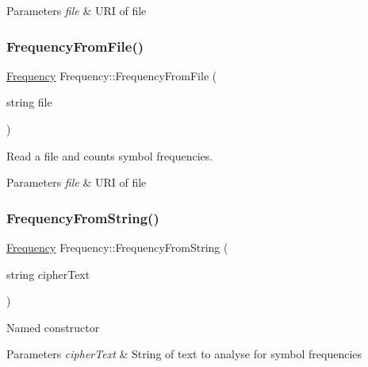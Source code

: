 \begin{DoxyParams}{Parameters}
{\em file} & U\+RI of file \\
\hline
\end{DoxyParams}
\mbox{\label{classFrequency_ae46fea585785720e124b45643914f4c6}} 
\subsubsection{\texorpdfstring{Frequency\+From\+File()}{FrequencyFromFile()}}
{\footnotesize\ttfamily \hyperlink{classFrequency}{Frequency} Frequency\+::\+Frequency\+From\+File (\begin{DoxyParamCaption}\item[{string}]{file }\end{DoxyParamCaption})\hspace{0.3cm}{\ttfamily [static]}}

Read a file and counts symbol frequencies.


\begin{DoxyParams}{Parameters}
{\em file} & U\+RI of file \\
\hline
\end{DoxyParams}
\mbox{\label{classFrequency_a1f7df4dabf9cdf839f9884ee844c6752}} 
\subsubsection{\texorpdfstring{Frequency\+From\+String()}{FrequencyFromString()}}
{\footnotesize\ttfamily \hyperlink{classFrequency}{Frequency} Frequency\+::\+Frequency\+From\+String (\begin{DoxyParamCaption}\item[{string}]{cipher\+Text }\end{DoxyParamCaption})\hspace{0.3cm}{\ttfamily [static]}}

Named constructor


\begin{DoxyParams}{Parameters}
{\em cipher\+Text} & String of text to analyse for symbol frequencies \\
\hline
\end{DoxyParams}
\mbox{\label{classFrequency_ad26f1ea2a3952447a6188d73cd26ca16}} 
